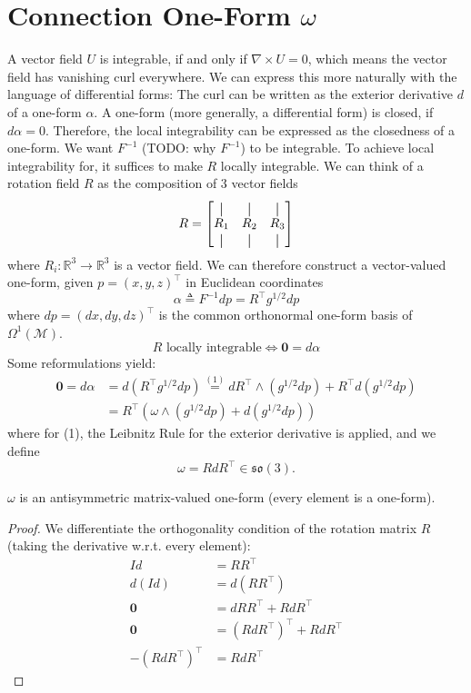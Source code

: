 \documentclass[../thesis.tex]{subfiles}
\begin{document}
\chapter{Connection One-Form $\omega$}
\label{ch:connection}
A vector field $U$ is integrable, if and only if $\nabla \times U = 0$,
which means the vector field has vanishing curl everywhere.
We can express this more naturally with the language of differential forms:
The curl can be written as the exterior derivative $d$ of a one-form $\alpha$.
A one-form (more generally, a differential form) is closed, if $d\alpha = 0$.
Therefore, the local integrability can be expressed as the closedness of a one-form.
We want $F^{-1}$ (TODO: why $F^{-1}$) to be integrable.
To achieve local integrability for, it suffices to make $R$ locally integrable.
We can think of a rotation field $R$ as the composition of 3 vector fields
$$R = \begin{bmatrix}
  \vertbar & \vertbar & \vertbar \\
  R_1 & R_2 & R_3 \\
  \vertbar & \vertbar & \vertbar
\end{bmatrix}$$
where $R_i : \mathbb{R}^3 \to \mathbb{R}^3$ is a vector field.
We can therefore construct a vector-valued one-form, given $p=(x,y,z)^{\top}$ in Euclidean coordinates
$$\alpha \triangleq F^{-1}dp = R^{\top}g^{1/2}dp$$
where $dp = (dx,dy,dz)^{\top}$ is the common orthonormal one-form basis of $\Omega^1(\mathcal{M})$.
$$R \text{ locally integrable} \iff \bm{0} = d\alpha$$
Some reformulations yield:
\begin{align*}
  \bm{0} = d\alpha &= d(R^{\top}g^{1/2}dp)\overset{(1)}{=} dR^{\top} \wedge  (g^{1/2}dp) + R^{\top}d(g^{1/2}dp) \\
  &= R^{\top}(\omega \wedge (g^{1/2}dp)+ d(g^{1/2}dp))
\end{align*} where for (1), the Leibnitz Rule for the exterior derivative is applied,
and we define
$$\omega = RdR^{\top} \in \mathfrak{so}(3).$$
\begin{remark}
  $\omega$ is an antisymmetric matrix-valued one-form (every element is a one-form).
\end{remark}
\begin{proof}
  We differentiate the orthogonality condition of the rotation matrix $R$ (taking the derivative w.r.t. every element):
  \begin{align*}
    Id &= RR^{\top} \\
    d(Id) &= d(RR^{\top}) \\
    \bm{0} &= dRR^{\top} + RdR^{\top} \\
    \bm{0} &= (RdR^{\top})^{\top} + RdR^{\top} \\
    -(RdR^{\top})^{\top} &= RdR^{\top}
  \end{align*}
\end{proof}
\end{document}
